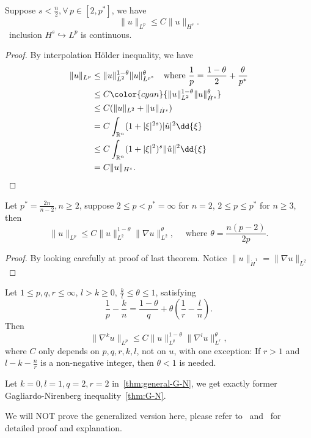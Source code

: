 \documentclass[UTF8,12pt]{article}
\numberwithin{theorem}{section}
\numberwithin{equation}{section}
\begin{document}
\begin{theorem}\hfill\par
    Suppose \(s<\frac{n}{2},\forall\,p\in [2,p^*]\), we have \[
        \|u\|_{L^p}\le C\|u\|_{H^s}
    .\] \ie\ inclusion \(H^s\hookrightarrow L^p\) is continuous.
\end{theorem}
\begin{proof}
    By interpolation H\"older inequality, we have
    \begin{align*}
        \|u\|_{L^p}
        &\le \|u\|_{L^2}^{1-\theta}\|u\|_{L^{p^*}}^{\theta}
        \quad \text{where }\frac{1}{p}=\frac{1-\theta}{2}+\frac{\theta}{p^*} \\
        &\le C\color{cyan}{\|u\|_{L^2}^{1-\theta}\|u\|_{\dot{H}^s}^\theta} \\
        &\le C(\|u\|_{L^2}+\|u\|_{\dot{H}^s}) \\
        &= C\int_{\mathbb{R}^n}(1+|\xi|^{2s})|\hat{u}|^2\dd{\xi} \\
        &\le C\int_{\mathbb{R}^n}(1+|\xi|^2)^s\|\hat{u}\|^2\dd{\xi} \\
        &= C\|u\|_{H^s}
    .\end{align*}
\end{proof}

\begin{theorem}\label{thm:G-N}
    \hfill\par
    Let \(p^*=\frac{2n}{n-2},n\ge 2\), suppose \(2\le p<p^*=\infty\) for \(n=2\),
    \(2\le p\le p^*\) for \(n\ge 3\), then \[
        \|u\|_{L^p}\le C\|u\|_{L^2}^{1-\theta}\|\nabla u\|_{L^2}^\theta,
        \quad\text{ where }\theta=\frac{n(p-2)}{2p}.
    \]
\end{theorem}
\begin{proof}
    By looking carefully at proof of last theorem. Notice \(\|u\|_{\dot{H}^1}
    =\|\nabla u\|_{L^2}\)
\end{proof}

\begin{theorem}\label{thm:general-G-N}
    \hfill\par
    Let \(1\le p,q,r\le \infty\), \(l>k\ge 0\), \(\frac{k}{l}\le \theta\le 1\),
    satisfying \[
        \frac{1}{p}-\frac{k}{n}=\frac{1-\theta}{q}+\theta(\frac{1}{r}-\frac{l}{n})
    .\] Then \[
        \|\nabla^k u\|_{L^p}\le C\|u\|_{L^q}^{1-\theta}\|\nabla^l u\|_{L^r}^{\theta}
    ,\] where \(C\) only depends on \(p,q,r,k,l\), not on \(u\), with one exception:
    If \(r>1\) and \(l-k-\frac{n}{r}\) is a non-negative integer, then \(\theta<1\)
    is needed.
\end{theorem}
\begin{remark}
    Let \(k=0,l=1,q=2,r=2\) in~\cref{thm:general-G-N}, we get exactly former
    Gagliardo-Nirenberg inequality~\cref{thm:G-N}.
\end{remark}
We will NOT prove the generalized version here, please refer
to~\cite{nirenberg_elliptic_2011} and~\cite{fiorenza_detailed_2021} for detailed
proof and explanation.
\end{document}
